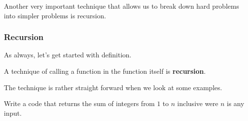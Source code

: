 \documentclass[../../main.tex]{subfiles}
\begin{document}
Another very important technique that allows us to break down hard
problems into simpler problems is recursion.

\subsubsection{Recursion}

As always, let's get started with definition.

\begin{definition}{}{}
A technique of calling a function in the function itself is
\textbf{recursion}.
\end{definition}

The technique is rather straight forward when we look at some
examples.

\begin{problem}{}{}
Write a code that returns the sum of integers from $1$ to $n$
inclusive were $n$ is any input.
\end{problem}
\end{document}
